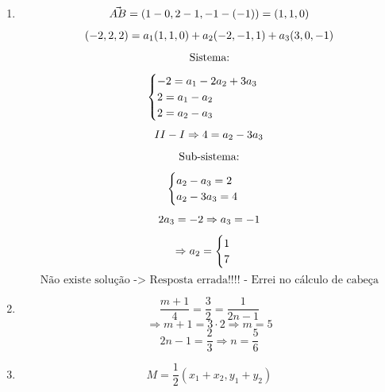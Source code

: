 \documentclass[
  12pt,
  openright,
  a4paper,
  twoside,
  english,
  brazil,
]{article}
\begin{document}
\begin{enumerate}[\bfseries  1.]
  \item
    $$
    \vec{AB} = (1-0, 2-1, -1-(-1)) = (1, 1, 0)\\
    $$
    $$
    (-2, 2, 2) = a_1(1, 1, 0) + a_2(-2, -1, 1) + a_3(3, 0, -1)\\
    $$
    $$
    \text{Sistema:}\\
    $$
    $$
    \begin{cases}
      -2 = a_1 - 2a_2 + 3a_3 \\
      2 = a_1 - a_2\\
      2 = a_2-a_3
    \end{cases}\\
    $$
    $$
    II - I \Rightarrow 4 = a_2 - 3a_3\\
    $$
    $$
    \text{Sub-sistema:}\\
    $$
    $$
    \begin{cases} a_2 - a_3 = 2 \\ a_2 - 3a_3 = 4
    \end{cases}\\
    $$
    $$
    2a_3 = -2 \Rightarrow a_3 = -1\\
    $$
    $$
    \Rightarrow a_2 =
    \begin{cases}1\\7
    \end{cases}\\
    $$
    $$
    \text{Não existe solução -> Resposta errada!!!! - Errei no
    cálculo de cabeça}
    $$

  \item
    $$
    \frac{m+1}{4} = \frac{3}{2} = \frac{1}{2n-1}
    $$
    $$
    \Rightarrow m + 1 = 3 \cdot 2 \Rightarrow m = 5
    $$
    $$
    2n - 1 = \frac{2}{3} \Rightarrow n = \frac{5}{6}
    $$

  \item
    $$
    M = \frac{1}{2}(x_1 + x_2, y_1 + y_2)
    $$

\end{enumerate}
\end{document}
